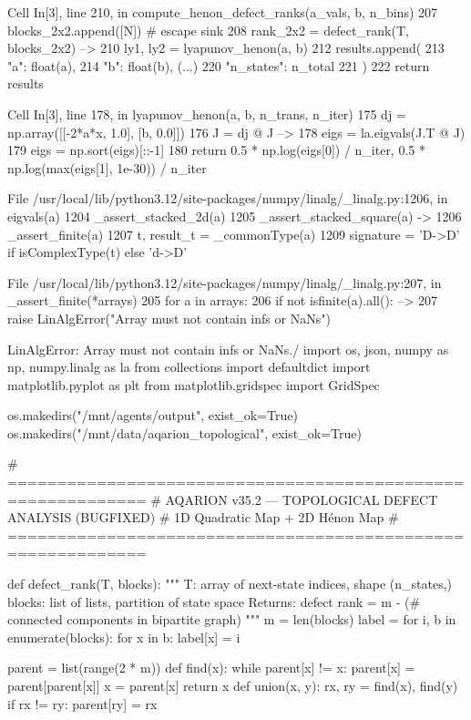 {{{{{{{{{{{{{Cell In[3], line 210, in compute_henon_defect_ranks(a_vals, b, n_bins)
    207     blocks_2x2.append([N])  # escape sink
    208     rank_2x2 = defect_rank(T, blocks_2x2)
--> 210     ly1, ly2 = lyapunov_henon(a, b)
    212     results.append({
    213         "a": float(a),
    214         "b": float(b),
   (...)    220         "n_states": n_total
    221     })
    222 return results

Cell In[3], line 178, in lyapunov_henon(a, b, n_trans, n_iter)
    175     dj = np.array([[-2*a*x, 1.0], [b, 0.0]])
    176     J = dj @ J
--> 178 eigs = la.eigvals(J.T @ J)
    179 eigs = np.sort(eigs)[::-1]
    180 return 0.5 * np.log(eigs[0]) / n_iter, 0.5 * np.log(max(eigs[1], 1e-30)) / n_iter

File /usr/local/lib/python3.12/site-packages/numpy/linalg/_linalg.py:1206, in eigvals(a)
   1204 _assert_stacked_2d(a)
   1205 _assert_stacked_square(a)
-> 1206 _assert_finite(a)
   1207 t, result_t = _commonType(a)
   1209 signature = 'D->D' if isComplexType(t) else 'd->D'

File /usr/local/lib/python3.12/site-packages/numpy/linalg/_linalg.py:207, in _assert_finite(*arrays)
    205 for a in arrays:
    206     if not isfinite(a).all():
--> 207         raise LinAlgError("Array must not contain infs or NaNs")

LinAlgError: Array must not contain infs or NaNs./
import os, json, numpy as np, numpy.linalg as la
from collections import defaultdict
import matplotlib.pyplot as plt
from matplotlib.gridspec import GridSpec

os.makedirs("/mnt/agents/output", exist_ok=True)
os.makedirs("/mnt/data/aqarion_topological", exist_ok=True)

# ============================================================
# AQARION v35.2 — TOPOLOGICAL DEFECT ANALYSIS (BUGFIXED)
# 1D Quadratic Map + 2D Hénon Map
# ============================================================

def defect_rank(T, blocks):
    """
    T: array of next-state indices, shape (n_states,)
    blocks: list of lists, partition of state space
    Returns: defect rank = m - (# connected components in bipartite graph)
    """
    m = len(blocks)
    label = {}
    for i, b in enumerate(blocks):
        for x in b:
            label[x] = i
    
    parent = list(range(2 * m))
    def find(x):
        while parent[x] != x:
            parent[x] = parent[parent[x]]
            x = parent[x]
        return x
    def union(x, y):
        rx, ry = find(x), find(y)
        if rx != ry:
            parent[ry] = rx
    
}}}}}}}}}}}}}
